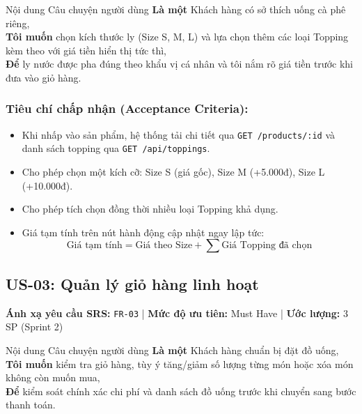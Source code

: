 \documentclass[12pt,a4paper]{article}
\begin{document}
\begin{storybox}{Nội dung Câu chuyện người dùng}
\textbf{Là một} Khách hàng có sở thích uống cà phê riêng,\\
\textbf{Tôi muốn} chọn kích thước ly (Size S, M, L) và lựa chọn thêm các loại Topping kèm theo với giá tiền hiển thị tức thì,\\
\textbf{Để} ly nước được pha đúng theo khẩu vị cá nhân và tôi nắm rõ giá tiền trước khi đưa vào giỏ hàng.
\end{storybox}

\subsubsection*{Tiêu chí chấp nhận (Acceptance Criteria):}
\begin{itemize}[noitemsep]
    \item[\textbf{AC-02.1}] Khi nhấp vào sản phẩm, hệ thống tải chi tiết qua \texttt{GET /products/:id} và danh sách topping qua \texttt{GET /api/toppings}.
    \item[\textbf{AC-02.2}] Cho phép chọn một kích cỡ: Size S (giá gốc), Size M (+5.000đ), Size L (+10.000đ).
    \item[\textbf{AC-02.3}] Cho phép tích chọn đồng thời nhiều loại Topping khả dụng.
    \item[\textbf{AC-02.4}] Giá tạm tính trên nút hành động cập nhật ngay lập tức: 
    \[ \text{Giá tạm tính} = \text{Giá theo Size} + \sum \text{Giá Topping đã chọn} \]
\end{itemize}

\newpage

\subsection{US-03: Quản lý giỏ hàng linh hoạt}
\textbf{Ánh xạ yêu cầu SRS:} \texttt{FR-03} \quad | \quad \textbf{Mức độ ưu tiên:} Must Have \quad | \quad \textbf{Ước lượng:} 3 SP (Sprint 2)

\begin{storybox}{Nội dung Câu chuyện người dùng}
\textbf{Là một} Khách hàng chuẩn bị đặt đồ uống,\\
\textbf{Tôi muốn} kiểm tra giỏ hàng, tùy ý tăng/giảm số lượng từng món hoặc xóa món không còn muốn mua,\\
\textbf{Để} kiểm soát chính xác chi phí và danh sách đồ uống trước khi chuyển sang bước thanh toán.
\end{storybox}
\end{document}
